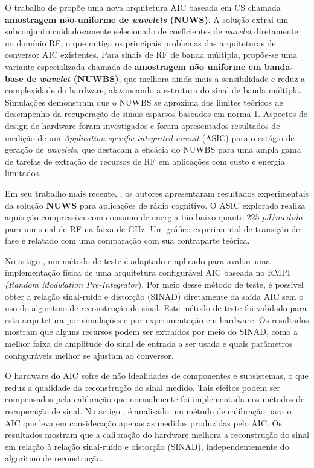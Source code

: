 \documentclass[a4paper, 12pt]{article}
\begin{document}
O trabalho de \cite{pelissier2017non} propõe uma nova arquitetura AIC baseada em CS chamada \textbf{amostragem não-uniforme de \textit{wavelets} (NUWS)}. A solução extrai um subconjunto cuidadosamente selecionado de coeficientes de \textit{wavelet} diretamente no domínio RF, o que mitiga os principais problemas das arquiteturas de conversor AIC existentes. Para sinais de RF de banda múltipla, propõe-se uma variante especializada chamada de \textbf{amostragem não uniforme em banda-base de \textit{wavelet} (NUWBS)}, que melhora ainda mais a sensibilidade e reduz a complexidade do hardware, alavancando a estrutura do sinal de banda múltipla. Simulações demonstram que o NUWBS se aproxima dos limites teóricos de desempenho da recuperação de sinais esparsos baseados em norma 1. Aspectos de design de hardware foram investigados e foram apresentados resultados de medição de um \textit{Application-specific integrated circuit} (ASIC) para o estágio de geração de \textit{wavelets}, que destacam a eficácia do NUWBS para uma ampla gama de tarefas de extração de recursos de RF em aplicações com custo e energia limitados.

Em seu trabalho mais recente, \cite{pelissierexperimental}, os autores apresentaram resultados experimentais da solução \textbf{NUWS} para aplicações de rádio cognitivo. O ASIC explorado realiza aquisição compressiva com consumo de energia tão baixo quanto $225$ $pJ/medida$ para um sinal de RF na faixa de GHz. Um gráfico experimental de transição de fase é relatado com uma comparação com sua contraparte teórica.

No artigo \cite{silva2018testing}, um método de teste é adaptado e aplicado para avaliar uma implementação física de uma arquitetura configurável AIC baseada no RMPI \textit{(Random Modulation Pre-Integrator}). Por meio desse método de teste, é possível obter a relação sinal-ruído e distorção (SINAD) diretamente da saída AIC sem o uso do algoritmo de reconstrução de sinal. Este método de teste foi validado para esta arquitetura por simulações e por experimentação em hardware. Os resultados mostram que alguns recursos podem ser extraídos por meio do SINAD, como a melhor faixa de amplitude do sinal de entrada a ser usada e quais parâmetros configuráveis melhor se ajustam ao conversor.

O hardware do AIC sofre de não idealidades de componentes e subsistemas, o que reduz a qualidade da reconstrução do sinal medido. Tais efeitos podem ser compensados pela calibração que normalmente foi implementada nos métodos de recuperação de sinal. No artigo \cite{ws2018gain}, é analisado um método de calibração para o AIC que leva em consideração apenas as medidas produzidas pelo AIC. Os resultados mostram que a calibração do hardware melhora a reconstrução do sinal em relação à relação sinal-ruído e distorção (SINAD), independentemente do algoritmo de reconstrução.
\end{document}
